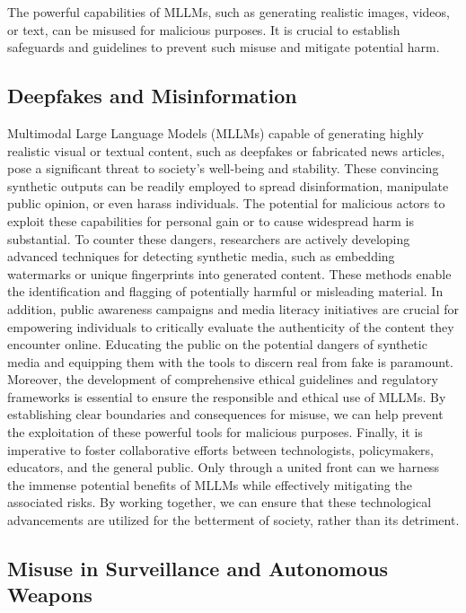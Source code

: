 The powerful capabilities of MLLMs, such as generating realistic images, videos, or text, can be misused for malicious purposes. It is crucial to establish safeguards and guidelines to prevent such misuse and mitigate potential harm.

\subsection{Deepfakes and Misinformation}

Multimodal Large Language Models (MLLMs) capable of generating highly realistic visual or textual content, such as deepfakes or fabricated news articles, pose a significant threat to society's well-being and stability. These convincing synthetic outputs can be readily employed to spread disinformation, manipulate public opinion, or even harass individuals. The potential for malicious actors to exploit these capabilities for personal gain or to cause widespread harm is substantial. To counter these dangers, researchers are actively developing advanced techniques for detecting synthetic media, such as embedding watermarks or unique fingerprints into generated content. These methods enable the identification and flagging of potentially harmful or misleading material. In addition, public awareness campaigns and media literacy initiatives are crucial for empowering individuals to critically evaluate the authenticity of the content they encounter online. Educating the public on the potential dangers of synthetic media and equipping them with the tools to discern real from fake is paramount. Moreover, the development of comprehensive ethical guidelines and regulatory frameworks is essential to ensure the responsible and ethical use of MLLMs. By establishing clear boundaries and consequences for misuse, we can help prevent the exploitation of these powerful tools for malicious purposes. Finally, it is imperative to foster collaborative efforts between technologists, policymakers, educators, and the general public. Only through a united front can we harness the immense potential benefits of MLLMs while effectively mitigating the associated risks. By working together, we can ensure that these technological advancements are utilized for the betterment of society, rather than its detriment.

\subsection{Misuse in Surveillance and Autonomous Weapons}

